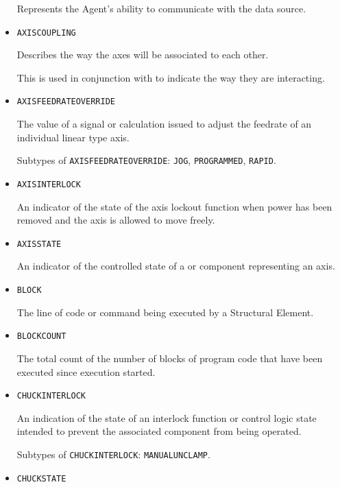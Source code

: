 \begin{itemize}
Represents the \gls{Agent}'s ability to communicate with the data source.


\item \texttt{AXIS\textunderscore COUPLING}  

Describes the way the axes will be associated to each other. 
  
This is used in conjunction with  to indicate the way they are interacting.


\item \texttt{AXIS\textunderscore FEEDRATE\textunderscore OVERRIDE}  

The value of a signal or calculation issued to adjust the feedrate of an individual linear type axis.

Subtypes of \texttt{AXIS\textunderscore FEEDRATE\textunderscore OVERRIDE}: \texttt{JOG}, \texttt{PROGRAMMED}, \texttt{RAPID}.

\item \texttt{AXIS\textunderscore INTERLOCK}  

An indicator of the state of the axis lockout function when power has been removed and the axis is allowed to move freely.


\item \texttt{AXIS\textunderscore STATE}  

An indicator of the controlled state of a  or  component representing an axis.


\item \texttt{BLOCK}  

The line of code or command being executed by a  \gls{Structural Element}.


\item \texttt{BLOCK\textunderscore COUNT}  

The total count of the number of blocks of program code that have been executed since execution started.


\item \texttt{CHUCK\textunderscore INTERLOCK}  

An indication of the state of an interlock function or control logic state intended to prevent the associated  component from being operated.

Subtypes of \texttt{CHUCK\textunderscore INTERLOCK}: \texttt{MANUAL\textunderscore UNCLAMP}.

\item \texttt{CHUCK\textunderscore STATE}  


\end{itemize}
